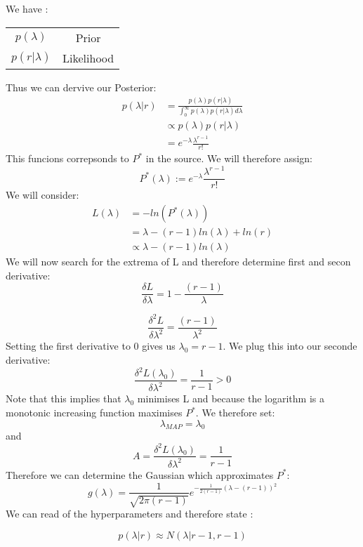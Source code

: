 We have :
\begin{center}
    \begin{tabular}{ c c }
     $p(\lambda)$ & Prior \\ 
     $p(r | \lambda)$ & Likelihood \\  
    \end{tabular}
    \end{center}
    Thus we can dervive our Posterior:
    \begin{align*}
        p(\lambda |r)   &= \frac{p( \lambda )p(r|\lambda)}{\int_0^{\infty}p(\lambda)p(r|\lambda)d\lambda}\\ 
                        & \propto p(\lambda)p(r|\lambda)\\
                        &= e^{-\lambda}\frac{\lambda^{r-1}}{r!}
    \end{align*}
    This funcions correpsonds to $P^*$ in the source. We will therefore  assign:
    \[
    P^*(\lambda) := e^{-\lambda}\frac{\lambda^{r-1}}{r!}   
    \]
    We will consider:
    \begin{align*}
        L(\lambda)  &= -ln(P^*(\lambda))\\
                    &= \lambda -(r-1)ln(\lambda)+ln(r)\\
                    &\propto \lambda -(r-1)ln(\lambda)
    \end{align*}
    We will now search for the extrema of L and therefore determine first and secon derivative:
    \[
    \frac{\delta L}{\delta \lambda}= 1-\frac{(r-1)}{\lambda}    
    \]

    \[
    \frac{\delta^2 L}{\delta \lambda^2}= \frac{(r-1)}{\lambda^2}    
    \]
    Setting the first derivative to 0 gives us $\lambda_0=r-1$. We plug this into our seconde derivative:
    \[
        \frac{\delta^2 L(\lambda_0)}{\delta \lambda^2} =\frac{1}{r-1}  >0
    \]
    Note that this implies that $\lambda_0$ minimises L and because the logarithm is a monotonic increasing function maximises $P^*$. We therefore set:
    \[
    \lambda_{MAP} = \lambda_0    
    \]
    and 
    \[
    A=   \frac{\delta^2 L(\lambda_0)}{\delta \lambda^2} =\frac{1}{r-1}  
    \]
    Therefore we can determine the Gaussian which approximates $P^*$:
    \[
    g(\lambda) = \frac{1}{\sqrt{2\pi(r-1)}}e^{-\frac{1}{2(r-1)}(\lambda-(r-1))^2}    
    \]
    We can read of the hyperparameters and therefore state :

    \[
    p(\lambda|r) \approx N(\lambda|r-1,r-1)   
    \]